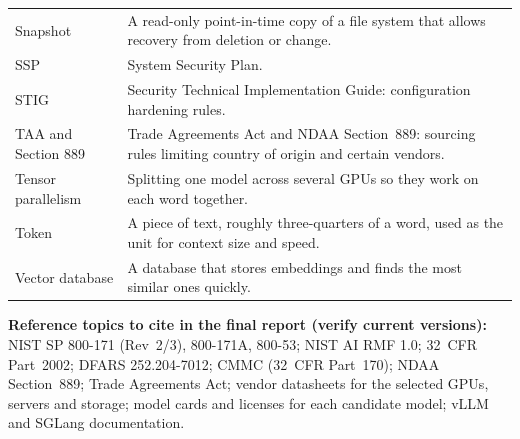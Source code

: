 {\begin{xltabular}{\textwidth}{@{}Y{0.55} Y{1.45}@{}}
  Snapshot & A read-only point-in-time copy of a file system that allows recovery from deletion or change. \\
  SSP & System Security Plan. \\
  STIG & Security Technical Implementation Guide: configuration hardening rules. \\
  TAA and Section 889 & Trade Agreements Act and NDAA Section~889: sourcing rules limiting country of origin and certain vendors. \\
  Tensor parallelism & Splitting one model across several GPUs so they work on each word together. \\
  Token & A piece of text, roughly three-quarters of a word, used as the unit for context size and speed. \\
  Vector database & A database that stores embeddings and finds the most similar ones quickly. \\
  \bottomrule
\end{xltabular}}

\textbf{Reference topics to cite in the final report (verify current versions):}
NIST SP 800-171 (Rev~2/3), 800-171A, 800-53; NIST AI RMF 1.0; 32~CFR Part~2002;
DFARS 252.204-7012; CMMC (32~CFR Part~170); NDAA Section~889; Trade Agreements Act;
vendor datasheets for the selected GPUs, servers and storage; model cards and licenses
for each candidate model; vLLM and SGLang documentation.
